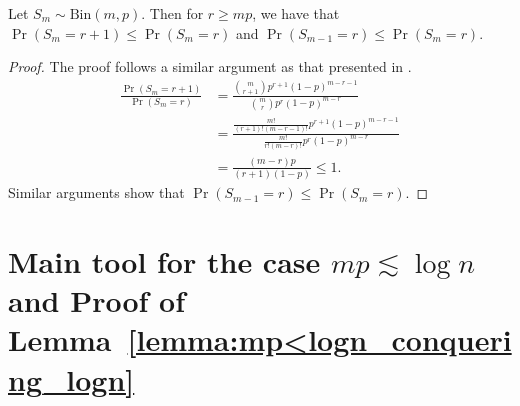 \begin{lemma}  \label{lemma:binomial_monotonicity}
Let $S_m \sim \mathrm{Bin}(m, p)$. Then for $r \geq mp$, we have that $\Pr(S_m = r + 1) \leq \Pr(S_m = r)$ and \(\Pr(S_{m-1} = r) \leq \Pr(S_{m} = r)\).
\end{lemma}
%
\begin{proof}
The proof follows a similar argument as that presented in \cite{bunke_feller_1969}.  
\begin{align*}
\frac{\Pr(S_m = r + 1)}{\Pr(S_m = r)} &= \frac{ {m \choose r+1} p^{r+1} (1 - p)^{m - r - 1} }{ {m \choose r} p^r (1 - p)^{m - r} } \\
&= \frac{ \frac{m!}{(r + 1)! (m - r - 1)!} p^{r + 1} (1-p)^{m - r - 1}}{ \frac{m!}{r! (m - r)!} p^r (1-p)^{m - r}} \\
&= \frac{(m - r) p }{(r + 1) (1-p)} \leq 1. 
\end{align*}
Similar arguments show that \(\Pr(S_{m-1} = r) \leq \Pr(S_{m} = r)\).
\end{proof}

\vspace{1em}

\section{Main tool for the case \(mp \lesssim \log n\) and Proof of Lemma~\ref{lemma:mp<logn_conquering_logn}}\label{app:geom_alg}

